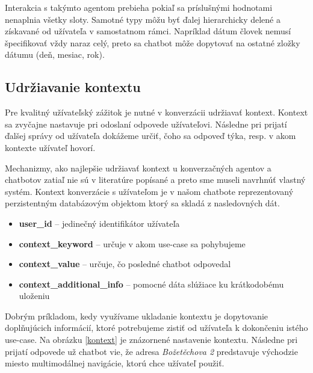 \documentclass{ExcelAtFIT}
\begin{document}
\noindent Interakcia s takýmto agentom prebieha pokiaľ sa príslušnými hodnotami nenaplnia všetky sloty. 
Samotné typy môžu byť ďalej hierarchicky delené a získavané od užívateľa v samostatnom rámci. Napríklad dátum človek nemusí špecifikovať vždy naraz celý, preto sa chatbot môže dopytovať na ostatné zložky dátumu (deň, mesiac, rok).

\subsection{Udržiavanie kontextu}

Pre kvalitný užívateľský zážitok je nutné v konverzácii udržiavať kontext. Kontext sa zvyčajne nastavuje pri odoslaní odpovede užívateľovi. Následne pri prijatí ďalšej správy od užívateľa dokážeme určiť, čoho sa odpoveď týka, resp. v akom kontexte užívateľ hovorí.

Mechanizmy, ako najlepšie udržiavať kontext u konverzačných agentov a chatbotov zatiaľ nie sú v literatúre popísané a preto sme museli navrhnúť vlastný systém. Kontext konverzácie s užívateľom je v našom chatbote reprezentovaný perzistentným databázovým objektom ktorý sa skladá z nasledovných dát.

\begin{itemize}
    \item \textbf{user\_id} -- jedinečný identifikátor užívateľa
    \item \textbf{context\_keyword} -- určuje v akom use-case sa pohybujeme
    \item \textbf{context\_value} -- určuje, čo posledné chatbot odpovedal
    \item \textbf{context\_additional\_info} -- pomocné dáta slúžiace ku krátkodobému uloženiu
\end{itemize}

Dobrým príkladom, kedy využívame ukladanie kontextu je dopytovanie doplňujúcich informácií, ktoré potrebujeme zistiť od užívateľa k dokončeniu istého use-case.
Na obrázku \ref{kontext} je znázornené nastavenie kontextu. Následne pri prijatí odpovede už chatbot vie, že adresa \emph{Božetěchova 2} predstavuje východzie miesto multimodálnej navigácie, ktorú chce užívateľ použiť.
\end{document}
